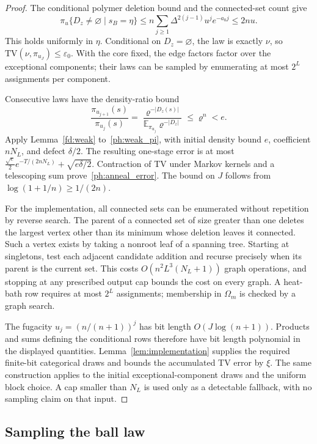 \documentclass[11pt]{article}
\newcommand{\TV}{\mathrm{TV}}
\def\E{\mathbb{E}}
\numberwithin{equation}{section}
\begin{document}
\begin{proof}
The conditional polymer deletion bound and the connected-set count give
\[
 \pi_u\{D_z\ne\varnothing\mid s_B=\eta\}
 \le n\sum_{j\ge1}\Delta^{2(j-1)}u^je^{-a_0j}
 \le2nu.
\]
This holds uniformly in $\eta$. Conditional on $D_z=\varnothing$, the law is exactly $\nu$, so $\TV(\nu,\pi_{u_J})\le\varepsilon_0$. With the core fixed, the edge factors factor over the exceptional components; their laws can be sampled by enumerating at most $2^L$ assignments per component.

Consecutive laws have the density-ratio bound
\[
    \frac{\pi_{u_{j+1}}(s)}{\pi_{u_j}(s)}
    =\frac{\varrho^{-|D_z(s)|}}
                 {\E_{\pi_{u_j}}\varrho^{-|D_z|}}
    \le\varrho^n<e.
\]
Apply Lemma~\ref{fd:weak} to~\eqref{ph:weak_pi}, with initial density bound $e$, coefficient $nN_L$, and defect $\delta/2$. The resulting one-stage error is at most
$\frac{\sqrt e}{2}e^{-T/(2nN_L)}+\sqrt{e\delta/2}$. Contraction of TV under Markov kernels and a telescoping sum prove~\eqref{ph:anneal_error}. The bound on $J$ follows from $\log(1+1/n)\ge1/(2n)$.

For the implementation, all connected sets can be enumerated without repetition by reverse search. The parent of a connected set of size greater than one deletes the largest vertex other than its minimum whose deletion leaves it connected. Such a vertex exists by taking a nonroot leaf of a spanning tree. Starting at singletons, test each adjacent candidate addition and recurse precisely when its parent is the current set. This costs $O(n^2L^3(N_L+1))$ graph operations, and stopping at any prescribed output cap bounds the cost on every graph. A heat-bath row requires at most $2^L$ assignments; membership in $\Omega_m$ is checked by a graph search.

The fugacity $u_j=(n/(n+1))^j$ has bit length $O(J\log(n+1))$. Products and sums defining the conditional rows therefore have bit length polynomial in the displayed quantities. Lemma~\ref{lem:implementation} supplies the required finite-bit categorical draws and bounds the accumulated TV error by $\xi$. The same construction applies to the initial exceptional-component draws and the uniform block choice. A cap smaller than $N_L$ is used only as a detectable fallback, with no sampling claim on that input.
\end{proof}

\subsection{Sampling the ball law}
\end{document}
